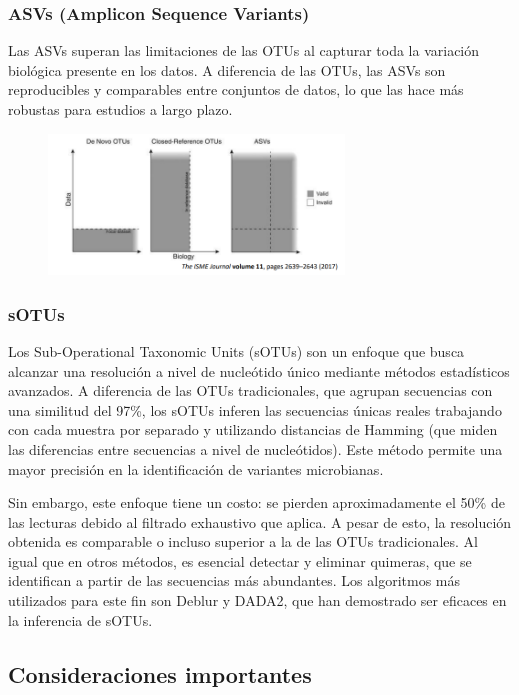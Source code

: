 \subsubsection{ASVs (Amplicon Sequence Variants)}
Las ASVs superan las limitaciones de las OTUs al capturar toda la variación biológica presente en los datos. A diferencia de las OTUs, las ASVs son reproducibles y comparables entre conjuntos de datos, lo que las hace más robustas para estudios a largo plazo.

\begin{figure}[h]
\centering
\includegraphics[width = 0.7\textwidth]{figs/AVS-OTU.png}
\end{figure}

\subsubsection{sOTUs}
Los Sub-Operational Taxonomic Units (sOTUs) son un enfoque que busca alcanzar una resolución a nivel de nucleótido único mediante métodos estadísticos avanzados. A diferencia de las OTUs tradicionales, que agrupan secuencias con una similitud del 97\%, los sOTUs inferen las secuencias únicas reales trabajando con cada muestra por separado y utilizando distancias de Hamming (que miden las diferencias entre secuencias a nivel de nucleótidos). Este método permite una mayor precisión en la identificación de variantes microbianas.

Sin embargo, este enfoque tiene un costo: se pierden aproximadamente el 50\% de las lecturas debido al filtrado exhaustivo que aplica. A pesar de esto, la resolución obtenida es comparable o incluso superior a la de las OTUs tradicionales. Al igual que en otros métodos, es esencial detectar y eliminar quimeras, que se identifican a partir de las secuencias más abundantes. Los algoritmos más utilizados para este fin son Deblur y DADA2, que han demostrado ser eficaces en la inferencia de sOTUs.

\subsection{Consideraciones importantes}
